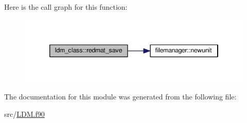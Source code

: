 Here is the call graph for this function\+:\nopagebreak
\begin{figure}[H]
\begin{center}
\leavevmode
\includegraphics[width=346pt]{classldm__class_a52cd911f4bfe5cf3fb751791b1590e92_cgraph}
\end{center}
\end{figure}




The documentation for this module was generated from the following file\+:\begin{DoxyCompactItemize}
\item 
src/\hyperlink{_l_d_m_8f90}{L\+D\+M.\+f90}\end{DoxyCompactItemize}

